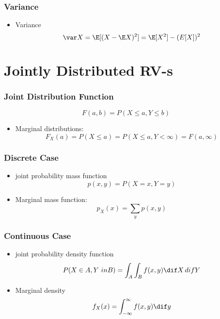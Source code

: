 \documentclass[mathserif, xcolor=table, svgnames]{beamer}
\begin{document}
\begin{frame}
  \frametitle{Variance}
  \begin{itemize}
  \item Variance
    \begin{equation*}
      \var X = \E [(X - \E X)^{2} ]
      = \E [X^{2}] - (E[X])^{2}
    \end{equation*}
  \end{itemize}
\end{frame}

\section{Jointly Distributed RV-s}

\begin{frame}
  \frametitle{Joint Distribution Function}
  \begin{equation*}
    F(a,b) = P( X \le a, Y \le b)
  \end{equation*}
  \begin{itemize}
  \item Marginal distributions:
    \begin{equation*}
      F_{X}(a) = P(X \le a)
      = P(X \le a, Y < \infty)
      = F(a, \infty)
    \end{equation*}
  \end{itemize}
\end{frame} 

\begin{frame}
  \frametitle{Discrete Case}
  \begin{itemize}
  \item joint probability mass function
    \begin{equation*}
      p(x,y) = P(X = x, Y=y)
    \end{equation*}
  \item Marginal mass function:
    \begin{equation*}
      p_{X} (x) = \sum_{y} p(x,y)
    \end{equation*}
  \end{itemize}
\end{frame}

\begin{frame}
  \frametitle{Continuous Case}
  \begin{itemize}
  \item joint probability density function
    \begin{equation*}
      P(X \in A, Y\ in B)
      =
      \int_{A} \int_{B} f(x,y) \dif X\, dif Y
    \end{equation*}
  \item Marginal density
    \begin{equation*}
      f_{X}(x) = \int_{-\infty}^{\infty} f(x,y) \dif y
    \end{equation*}
  \end{itemize}
\end{frame}
\end{document}
